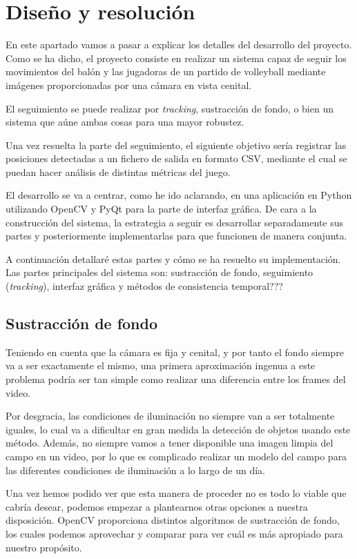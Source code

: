 \section{Diseño y resolución}

En este apartado vamos a pasar a explicar los detalles del desarrollo del proyecto. Como se ha dicho, el proyecto consiste en realizar un sistema capaz de seguir los movimientos del balón y las jugadoras de un partido de volleyball mediante imágenes proporcionadas por una cámara en vista cenital.

El seguimiento se puede realizar por \textit{tracking}, sustracción de fondo, o bien un sistema que aúne ambas cosas para una mayor robustez.

Una vez resuelta la parte del seguimiento, el siguiente objetivo sería registrar las posiciones detectadas a un fichero de salida en formato CSV, mediante el cual se puedan hacer análisis de distintas métricas del juego.

El desarrollo se va a centrar, como he ido aclarando, en una aplicación en Python utilizando OpenCV y PyQt para la parte de interfaz gráfica. De cara a la construcción del sistema, la estrategia a seguir es desarrollar separadamente sus partes y posteriormente implementarlas para que funcionen de manera conjunta.

A continuación detallaré estas partes y cómo se ha resuelto su implementación. Las partes principales del sistema son: sustracción de fondo, seguimiento (\textit{tracking}), interfaz gráfica y métodos de consistencia temporal???

\subsection{Sustracción de fondo}
Teniendo en cuenta que la cámara es fija y cenital, y por tanto el fondo siempre va a ser exactamente el mismo, una primera aproximación ingenua a este problema podría ser tan simple como realizar una diferencia entre los frames del video.

Por desgracia, las condiciones de iluminación no siempre van a ser totalmente iguales, lo cual va a dificultar en gran medida la detección de objetos usando este método. Además, no siempre vamos a tener disponible una imagen limpia del campo en un video, por lo que es complicado realizar un modelo del campo para las diferentes condiciones de iluminación a lo largo de un día.

Una vez hemos podido ver que esta manera de proceder no es todo lo viable que cabría desear, podemos empezar a plantearnos otras opciones a nuestra disposición. OpenCV proporciona distintos algoritmos de sustracción de fondo, los cuales podemos aprovechar y comparar para ver cuál es más apropiado para nuestro propósito.


